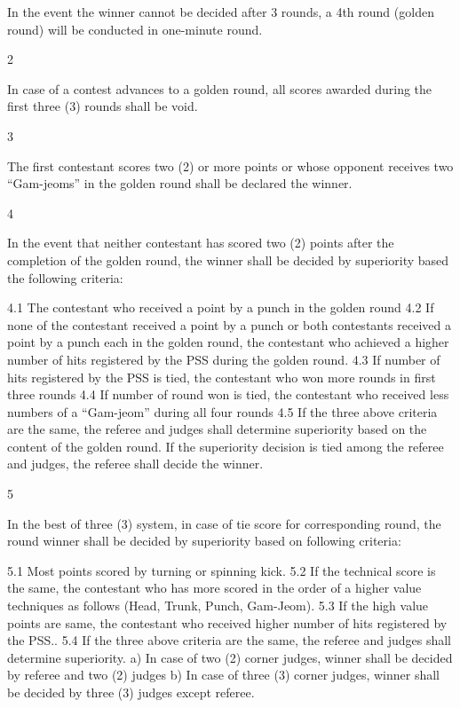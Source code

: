 \documentclass[
]{report}
\begin{document}
In the event the winner cannot be decided after 3 rounds, a 4th round
(golden round) will be conducted in one-minute round.

2

In case of a contest advances to a golden round, all scores awarded
during the first three (3) rounds shall be void.

3

The first contestant scores two (2) or more points or whose opponent
receives two ``Gam-jeoms'' in the golden round shall be declared the
winner.

4

In the event that neither contestant has scored two (2) points after the
completion of the golden round, the winner shall be decided by
superiority based the following criteria:

4.1 The contestant who received a point by a punch in the golden round
4.2 If none of the contestant received a point by a punch or both
contestants received a point by a punch each in the golden round, the
contestant who achieved a higher number of hits registered by the PSS
during the golden round. 4.3 If number of hits registered by the PSS is
tied, the contestant who won more rounds in first three rounds 4.4 If
number of round won is tied, the contestant who received less numbers of
a ``Gam-jeom'' during all four rounds 4.5 If the three above criteria
are the same, the referee and judges shall determine superiority based
on the content of the golden round. If the superiority decision is tied
among the referee and judges, the referee shall decide the winner.

5

In the best of three (3) system, in case of tie score for corresponding
round, the round winner shall be decided by superiority based on
following criteria:

5.1 Most points scored by turning or spinning kick. 5.2 If the technical
score is the same, the contestant who has more scored in the order of a
higher value techniques as follows (Head, Trunk, Punch, Gam-Jeom). 5.3
If the high value points are same, the contestant who received higher
number of hits registered by the PSS.. 5.4 If the three above criteria
are the same, the referee and judges shall determine superiority. a) In
case of two (2) corner judges, winner shall be decided by referee and
two (2) judges b) In case of three (3) corner judges, winner shall be
decided by three (3) judges except referee.
\end{document}
